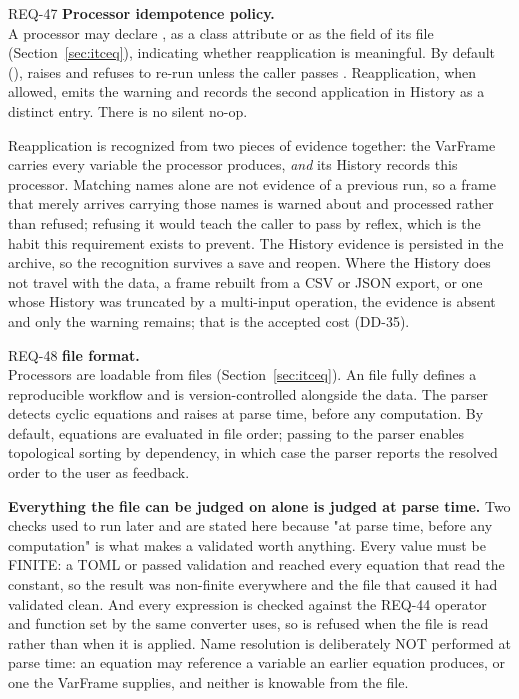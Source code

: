 \begin{reqbox}{REQ-47}{\stable}
\textbf{Processor idempotence policy.}\\
A processor may declare , as a class attribute
or as the  field of its  file
(Section~\ref{sec:itceq}), indicating whether reapplication is
meaningful. By default (),
 raises  and
refuses to re-run unless the caller passes .
Reapplication, when allowed, emits the warning and records the second
application in History as a distinct entry. There is no silent no-op.

Reapplication is recognized from two pieces of evidence together: the
VarFrame carries every variable the processor produces, \emph{and} its
History records this processor. Matching names alone are not evidence
of a previous run, so a frame that merely arrives carrying those names
is warned about and processed rather than refused; refusing it would
teach the caller to pass  by reflex, which is the
habit this requirement exists to prevent. The History evidence is
persisted in the  archive, so the recognition survives a
save and reopen. Where the History does not travel with the data, a
frame rebuilt from a CSV or JSON export, or one whose History was
truncated by a multi-input operation, the evidence is absent and only
the warning remains; that is the accepted cost (DD-35).
\end{reqbox}

\begin{reqbox}{REQ-48}{\stable}
\textbf{ file format.}\\
Processors are loadable from  files
(Section~\ref{sec:itceq}). An  file fully defines a
reproducible workflow and is version-controlled alongside the data. The
parser detects cyclic equations and raises  at parse
time, before any computation. By default, equations are evaluated in file
order; passing  to the parser enables topological
sorting by dependency, in which case the parser reports the resolved
order to the user as feedback.

\textbf{Everything the file can be judged on alone is judged at parse
time.} Two checks used to run later and are stated here because "at
parse time, before any computation" is what makes a validated
 worth anything. Every \code{[constants]} value must be
FINITE: a TOML  or  passed validation and reached
every equation that read the constant, so the result was non-finite
everywhere and the file that caused it had validated clean. And every
expression is checked against the REQ-44 operator and function set by
the same converter  uses, so  is refused
when the file is read rather than when it is applied. Name resolution
is deliberately NOT performed at parse time: an equation may reference
a variable an earlier equation produces, or one the VarFrame supplies,
and neither is knowable from the file.
\end{reqbox}

